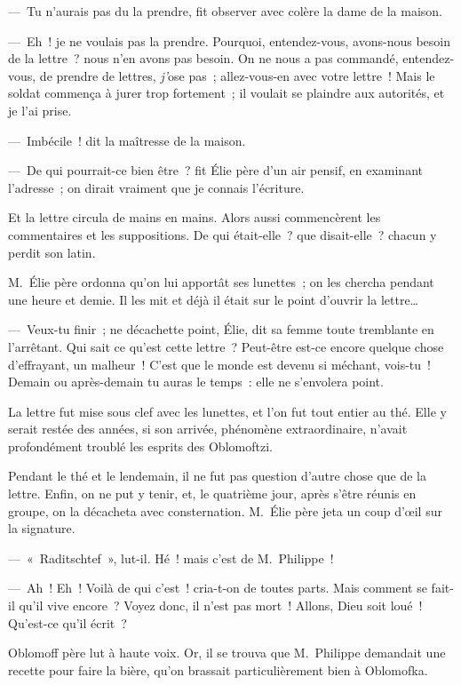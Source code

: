 \documentclass[french,twoside]{book} %
\begin{document}
— Tu n’aurais pas du la prendre, fit observer avec colère la dame de la maison.\par
— Eh ! je ne voulais pas la prendre. Pourquoi, entendez-vous, avons-nous besoin de la lettre ? nous n’en avons pas besoin. On ne nous a pas commandé, entendez-vous, de prendre de lettres, \emph{j’}ose pas ; allez-vous-en avec votre lettre ! Mais le soldat commença à jurer trop fortement ; il voulait se plaindre aux autorités, et je l’ai prise.\par
— Imbécile ! dit la maîtresse de la maison.\par
— De qui pourrait-ce bien être ? fit Élie père d’un air pensif, en examinant l’adresse ; on dirait vraiment que je connais l’écriture.\par
Et la lettre circula de mains en mains. Alors aussi commencèrent les commentaires et les suppositions. De qui était-elle ? que disait-elle ? chacun y perdit son latin.\par
M. Élie père ordonna qu’on lui apportât ses lunettes ; on les chercha pendant une heure et demie. Il les mit et déjà il était sur le point d’ouvrir la lettre…\par
— Veux-tu finir ; ne décachette point, Élie, dit sa femme toute tremblante en l’arrêtant. Qui sait ce qu’est cette lettre ? Peut-être est-ce encore quelque chose d’effrayant, un malheur ! C’est que le monde est devenu si méchant, vois-tu ! Demain ou après-demain tu auras le temps : elle ne s’envolera point.\par
La lettre fut mise sous clef avec les lunettes, et l’on fut tout entier au thé. Elle y serait restée des années, si son arrivée, phénomène extraordinaire, n’avait profondément troublé les esprits des Oblomoftzi.\par
Pendant le thé et le lendemain, il ne fut pas question d’autre chose que de la lettre. Enfin, on ne put y tenir, et, le quatrième jour, après s’être réunis en groupe, on la décacheta avec consternation. M. Élie père jeta un coup d’œil sur la signature.\par
— « Raditschtef », lut-il. Hé ! mais c’est de M. Philippe !\par
— Ah ! Eh ! Voilà de qui c’est ! cria-t-on de toutes parts. Mais comment se fait-il qu’il vive encore ? Voyez donc, il n’est pas mort ! Allons, Dieu soit loué ! Qu’est-ce qu’il écrit ?\par
Oblomoff père lut à haute voix. Or, il se trouva que M. Philippe demandait une recette pour faire la bière, qu’on brassait particulièrement bien à Oblomofka.\par
\end{document}
